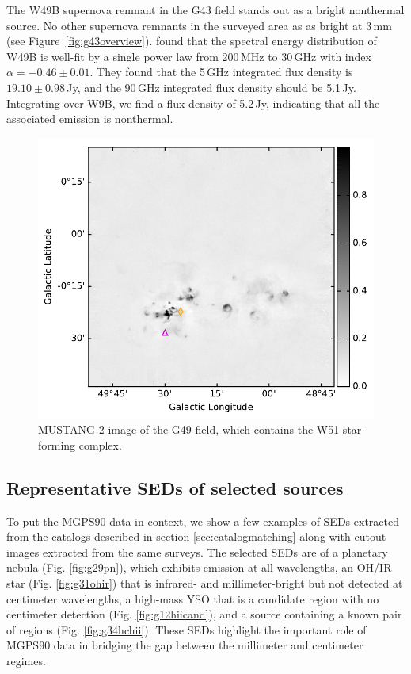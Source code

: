 \documentclass[twocolumn]{aastex62}
\newcommand{\MGPS}{MGPS90\xspace}
\newcommand{\MUSTANG}{MUSTANG-2\xspace}
\begin{document}
The W49B supernova remnant in the G43 field stands out as a bright nonthermal
source.  No other supernova remnants in the surveyed area as as bright at 3\,mm (see
Figure~\ref{fig:g43overview}). \citet{Sun2011a} found that the spectral energy
distribution of W49B is well-fit by a single power law from 200\,MHz to 30\,GHz
with index $\alpha=-0.46\pm0.01$.  They found that the 5\,GHz integrated flux density is
$19.10\pm0.98$\,Jy, and the 90\,GHz integrated flux density should be 5.1\,Jy.
Integrating over W9B, we find a flux density of 5.2\,Jy, indicating that all
the associated emission is nonthermal. 

\begin{figure}[htp]
\includegraphics[width=17cm]{figures/G49_overview_withcatalog.pdf}
\caption{\MUSTANG image of the G49 field, which contains the W51 star-forming
complex.}
\label{fig:g49overview}
\end{figure}

\subsection{Representative SEDs of selected sources}
To put the \MGPS data in context, we show a few examples of SEDs extracted
from the catalogs described in section \ref{sec:catalogmatching} along with
cutout images extracted from the same surveys.  The selected SEDs are of a
planetary nebula (Fig. \ref{fig:g29pn}), which exhibits emission at all
wavelengths, an OH/IR star (Fig. \ref{fig:g31ohir}) that is infrared- and
millimeter-bright but not detected at centimeter wavelengths, a high-mass
YSO that is a candidate \hchii region with no centimeter detection (Fig.
\ref{fig:g12hiicand}), and a source containing a known pair of \hchii regions
(Fig.  \ref{fig:g34hchii}).  These SEDs highlight the important role of \MGPS
data in bridging the gap between the millimeter and centimeter regimes.
\end{document}
